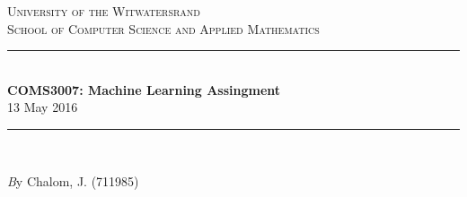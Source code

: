 \documentclass[11pt]{article}
\begin{document}
\begin{titlepage}

\newcommand{\HRule}{\rule{\linewidth}{0.3mm}} %
\renewcommand\section{\@startsection{section}{1}{\z@}%
                                  {-3.5ex \@plus -1ex \@minus -.2ex}%
                                  {2.3ex \@plus.2ex}%
                                  {\normalfont\large\bfseries}}

\center %
 

\textsc{\LARGE University of the Witwatersrand}\\[1.5cm] %
\textsc{\Large School of Computer Science and Applied Mathematics}\\[0.5cm] %


\HRule \\[0.4cm]
{ \huge \bfseries COMS3007: Machine Learning Assingment}\\[0.4cm] %
  \large 13 May 2016
\HRule \\[1.5cm]
 
\begin{minipage}{1\textwidth}
	\Large \emph By Chalom, J. (711985)\\
\end{minipage}


\vfill %

\end{titlepage}
\end{document}
